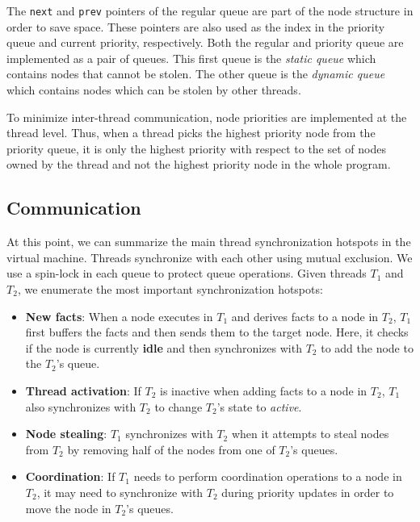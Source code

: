 The \texttt{next} and \texttt{prev} pointers of the regular queue are part of
the node structure in order to save space. These pointers are also used as the
index in the priority queue and current priority, respectively. Both the regular
and priority queue are implemented as a pair of queues.  This first queue is the
\emph{static queue} which contains nodes that cannot be stolen.  The other queue
is the \emph{dynamic queue} which contains nodes which can be stolen by other
threads.

To minimize inter-thread communication, node priorities are implemented at the
thread level. Thus, when a thread picks the highest priority node from the
priority queue, it is only the highest priority with respect to the set of nodes
owned by the thread and not the highest priority node in the whole program.  

\subsection{Communication}

At this point, we can summarize the main thread synchronization hotspots in the
virtual machine. Threads synchronize with each other using mutual exclusion. We
use a spin-lock in each queue to protect queue operations.  Given threads $T_1$
and $T_2$, we enumerate the most important synchronization hotspots:

\begin{itemize}

   \item \textbf{New facts}: When a node executes in $T_1$ and derives facts to
      a node in $T_2$, $T_1$ first buffers the facts and then sends them to the
      target node. Here, it checks if the node is currently \textbf{idle} and
      then synchronizes with $T_2$ to add the node to the $T_2$'s queue.

   \item \textbf{Thread activation}: If $T_2$ is inactive when adding facts to a
      node in $T_2$, $T_1$ also synchronizes with $T_2$ to change $T_2$'s state
      to \emph{active}.

   \item \textbf{Node stealing}: $T_1$ synchronizes with $T_2$ when it attempts
      to steal nodes from $T_2$ by removing half of the nodes from one of
      $T_2$'s queues.

   \item \textbf{Coordination}: If $T_1$ needs to perform coordination
      operations to a node in $T_2$, it may need to synchronize with $T_2$
      during priority updates in order to move the node in $T_2$'s queues.

\end{itemize}

